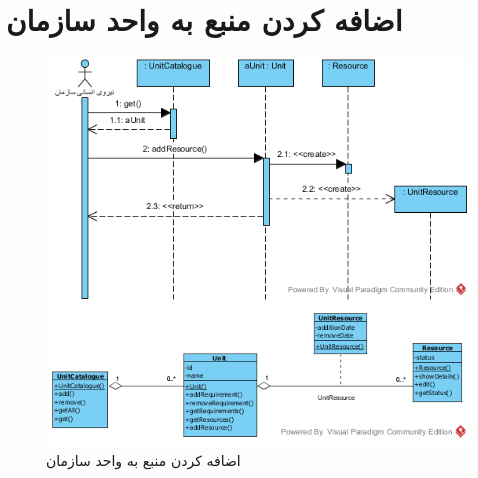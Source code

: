 \section{اضافه کردن منبع به واحد سازمان}
\begin{figure}[H]
	\centering
	\includegraphics[scale=0.8]{img/sequence-analysis/AddResourceToUnit}
	
	
	
	\includegraphics[scale=0.8]{img/sequence-analysis/AddResourceToUnitC}	
	\caption{اضافه کردن منبع به واحد سازمان}
\end{figure}

